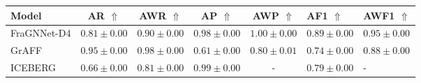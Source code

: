 \begin{tabular}{lcccc}
\toprule
Model & AR $\Uparrow$ & AWR $\Uparrow$ & AP $\Uparrow$ & AWP $\Uparrow$ & AF1 $\Uparrow$ & AWF1 $\Uparrow$ \\
\midrule
FraGNNet-D4 & $0.81 \pm 0.00$ & $0.90 \pm 0.00$ & $0.98 \pm 0.00$ & $1.00 \pm 0.00$ & $0.89 \pm 0.00$ & $0.95 \pm 0.00$ \\
GrAFF & $0.95 \pm 0.00$ & $0.98 \pm 0.00$ & $0.61 \pm 0.00$ & $0.80 \pm 0.01$ & $0.74 \pm 0.00$ & $0.88 \pm 0.00$ \\
ICEBERG & $0.66 \pm 0.00$ & $0.81 \pm 0.00$ & $0.99 \pm 0.00$ & - & $0.79 \pm 0.00$ & - \\
\bottomrule
\end{tabular}
